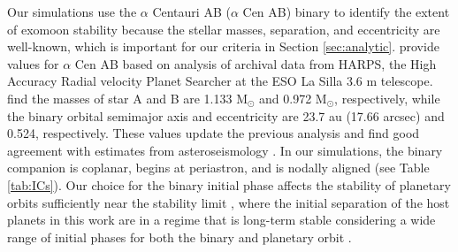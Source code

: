 \documentclass[preprint]{aastex63}
\begin{document}
Our simulations use the $\alpha$ Centauri AB ($\alpha$ Cen AB) binary to identify the extent of exomoon stability because the stellar masses, separation, and eccentricity are well-known, which is important for our criteria in Section \ref{sec:analytic}.  \cite{Pourbaix2016} provide values for $\alpha$ Cen AB based on analysis of archival data from HARPS, the High Accuracy Radial velocity Planet Searcher at the ESO La Silla 3.6 m telescope.  \citeauthor{Pourbaix2016} find the masses of star A and B are 1.133 M$_\odot$ and 0.972 M$_\odot$, respectively, while the binary orbital semimajor axis and eccentricity are 23.7 au (17.66 arcsec) and 0.524, respectively.  These values update the previous analysis \cite{Pourbaix2002} and find good agreement with estimates from asteroseismology \citep{Lundkvist2014}.  In our simulations, the binary companion is coplanar, begins at periastron, and is nodally aligned (see Table \ref{tab:ICs}).  Our choice for the binary initial phase affects the stability of planetary orbits sufficiently near the stability limit \citep{Quarles2018,Quarles2020}, where the initial separation of the host planets in this work are in a regime that is long-term stable considering a wide range of initial phases for both the binary and planetary orbit \citep{Quarles2020}. 
\end{document}
